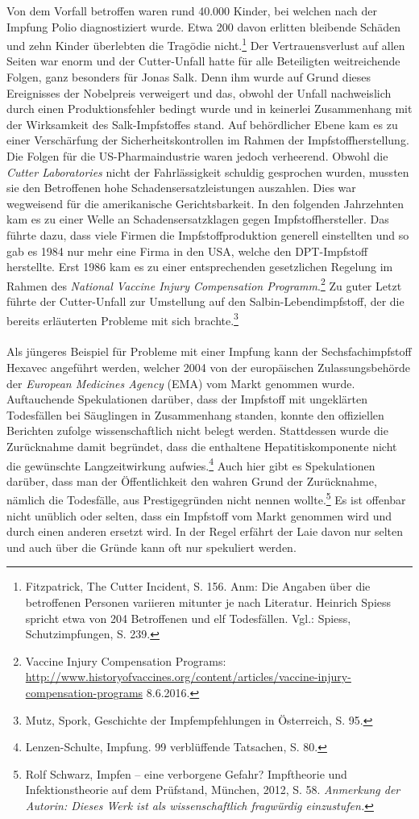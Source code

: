 \documentclass[
    a4paper,
    12pt,
    hyphens,
    chapterprefix=true,
    headheight=33pt,
    footheight=29pt,
    headings=optiontohead,
]{scrartcl}
\begin{document}
Von dem Vorfall betroffen waren rund 40.000 Kinder, bei welchen nach der Impfung Polio diagnostiziert wurde. Etwa 200
davon erlitten bleibende Schäden und zehn Kinder überlebten die Tragödie nicht.\footnote{Fitzpatrick, The Cutter Incident, S. 156. Anm: Die Angaben über die betroffenen Personen variieren mitunter je nach Literatur. Heinrich Spiess spricht etwa von 204 Betroffenen und elf Todesfällen. Vgl.: Spiess, Schutzimpfungen, S. 239.}
Der Vertrauensverlust auf allen Seiten war enorm und der Cutter-Unfall hatte für alle Beteiligten weitreichende Folgen,
ganz besonders für Jonas Salk. Denn ihm wurde auf Grund dieses Ereignisses der Nobelpreis verweigert und das, obwohl der Unfall
nachweislich durch einen Produktionsfehler bedingt wurde und in keinerlei Zusammenhang mit der Wirksamkeit des Salk-Impfstoffes stand.
Auf behördlicher Ebene kam es zu einer Verschärfung der Sicherheitskontrollen im Rahmen der Impfstoffherstellung.
Die Folgen für die US-Pharmaindustrie waren jedoch verheerend. Obwohl die \textit{Cutter Laboratories} nicht der Fahrlässigkeit
schuldig gesprochen wurden, mussten sie den Betroffenen hohe Schadensersatzleistungen auszahlen. Dies war wegweisend für die amerikanische Gerichtsbarkeit. In den folgenden Jahrzehnten kam es zu einer Welle an Schadensersatzklagen gegen Impfstoffhersteller.
Das führte dazu, dass viele Firmen die Impfstoffproduktion generell einstellten und so gab es 1984 nur mehr eine Firma in den USA, welche den DPT-Impfstoff herstellte. Erst 1986 kam es zu einer entsprechenden gesetzlichen Regelung im Rahmen des
\textit{National Vaccine Injury Compensation Programm}.\footnote{Vaccine Injury Compensation Programs: \url{http://www.historyofvaccines.org/content/articles/vaccine-injury-compensation-programs} 8.6.2016.}
Zu guter Letzt führte der Cutter-Unfall zur Umstellung auf den Salbin-Lebendimpfstoff, der die bereits erläuterten Probleme
mit sich brachte.\footnote{Mutz, Spork, Geschichte der Impfempfehlungen in Österreich, S. 95.}\\
\\
Als jüngeres Beispiel für Probleme mit einer Impfung kann der Sechsfachimpfstoff Hexavec angeführt werden, welcher 2004 von der europäischen Zulassungsbehörde der \textit{European Medicines Agency} (EMA) vom Markt genommen wurde. Auftauchende Spekulationen darüber, dass der Impfstoff mit ungeklärten Todesfällen bei Säuglingen in Zusammenhang standen, konnte den offiziellen Berichten zufolge wissenschaftlich nicht belegt werden. Stattdessen wurde die Zurücknahme damit begründet, dass die enthaltene Hepatitiskomponente nicht die gewünschte Langzeitwirkung aufwies.\footnote{Lenzen-Schulte, Impfung. 99 verblüffende Tatsachen, S. 80.} Auch hier gibt es Spekulationen darüber, dass man der Öffentlichkeit den wahren Grund der Zurücknahme, nämlich die Todesfälle, aus Prestigegründen nicht nennen wollte.\footnote{Rolf Schwarz, Impfen -- eine verborgene Gefahr? Impftheorie und Infektionstheorie auf dem Prüfstand, München, 2012, S. 58. \textit{Anmerkung der Autorin: Dieses Werk ist als wissenschaftlich fragwürdig einzustufen.}} Es ist offenbar nicht unüblich oder selten, dass ein Impfstoff vom Markt genommen wird und durch einen anderen ersetzt wird. In der Regel erfährt der Laie davon nur selten und auch über die Gründe kann oft nur spekuliert werden.
\end{document}

